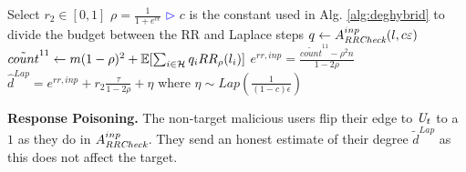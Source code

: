 %
%

\begin{algorithm}[bt]
	Select $r_2 \in [0,1]$\;
	$\rho = \frac{1}{1+e^{c\epsilon}}$\;
	\hfill\textcolor{blue}{$\rhd$} $c$ is the constant used in Alg. \ref{alg:deghybrid} to divide the budget between the RR and Laplace steps\;
	$q \gets A_{\textit{RRCheck}}^{inp}(l, c\varepsilon)$\;
	$\tilde{count}^{11} \gets m(1-\rho)^2 + \operatorname{\mathbb{E}}[\sum_{i \in \mathcal{H}} q_i RR_\rho(l_i)]$\;
	$ e^{rr,inp} = \frac{\tilde{count}^{11} - \rho^2 n}{1-2\rho}$\;
	$ \hat{d}^{Lap} = e^{rr,inp} + r_2 \frac{\tau}{1-2\rho} + \eta$ where $\eta \sim Lap(\frac{1}{(1-c)\epsilon})$\;
\caption{$A_{\DegHybrid}^{inp}: \{0,1\}^n\mapsto\{0,1\}^n$ }\label{alg:att-resp-inf2}
\end{algorithm}

\noindent\textbf{Response Poisoning.}
The non-target malicious users flip their edge to $\textit{U}_t$ to a $1$ as they do in $A_{\textit{RRCheck}{}}^{inp}$. They send an honest estimate of their degree $\tilde{d}^{Lap}$ as this does not affect the target.

